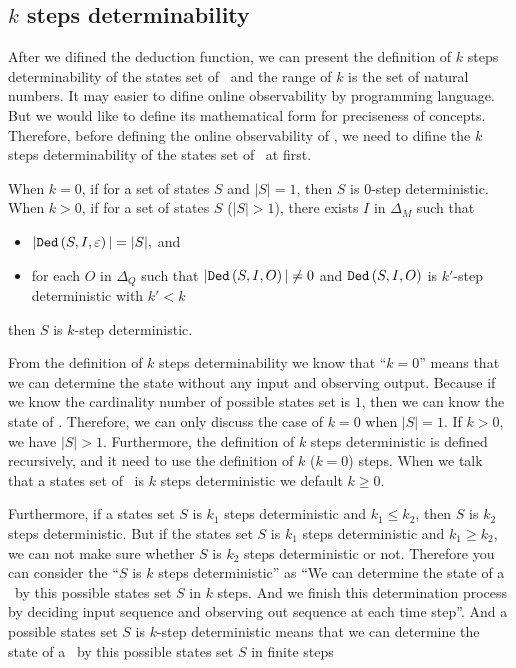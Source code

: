 \subsection{$k$ steps determinability}
After we difined the deduction function, we can present the definition of $k$ steps determinability of the states set of \BCNs\ and the range of $k$ is the set of natural numbers. It may easier to difine online observability by programming language. But we would like to define its mathematical form for preciseness of concepts. Therefore, before defining the online observability of \BCNs, we need to difine the $k$ steps determinability of the states set of \BCNs\ at first.
\begin{definition} 
When $k=0$, 
 if for a set of states $S$ and $|S|=1$, then $S$ is $0$-step deterministic. When $k>0$, 
 if for a set of states $S$ ($|S|>1$), there exists $I$ in $\Delta_M$ such that
 \begin{itemize}
 \item  $|{\tt Ded}\left(S,I,\varepsilon\right)|=|S|, $ and 
 \item  for each $O$ in $\Delta_Q$ such that $|{\tt Ded}\left(S,I,O\right)|\neq 0$ and ${\tt Ded}\left(S,I,O\right)$ is $k'$-step deterministic with  ${k'}<k$
 \end{itemize}
  then $S$ is $k$-step deterministic.
\end{definition}

From the definition of {\em$k$} steps determinability we know that ``$k=0$'' means that we can determine the state without any input and observing output. Because if we know the cardinality number of possible states set is $1$, then we can know the state of \BCNs. Therefore, we can only discuss the case of $k=0$ when $|S|=1$. If $k>0$, we have $|S|>1$. Furthermore, the definition of $k$ steps deterministic is defined recursively, and it need to use the definition of $k$ ($k=0$) steps. When we talk that a states set of \BCNs\ is $k$ steps deterministic we default $k\ge0$.

Furthermore, if a states set $S$ is $k_1$ steps deterministic and $k_1\leq k_2$, then $S$ is $k_2$ steps deterministic. But if the states set $S$ is $k_1$ steps deterministic and $k_1\geq k_2$, we can not make sure whether $S$ is $k_2$ steps deterministic or not. Therefore you can consider the ``$S$ is $k$ steps deterministic'' as ``We can determine the state of a \BCN\ by this possible states set $S$ in $k$ steps. And we finish this determination process by deciding input sequence and observing out sequence at each time step''. And a possible states set $S$ is $k$-step deterministic means that we can determine the state of a \BCN\ by this possible states set $S$ in finite steps
